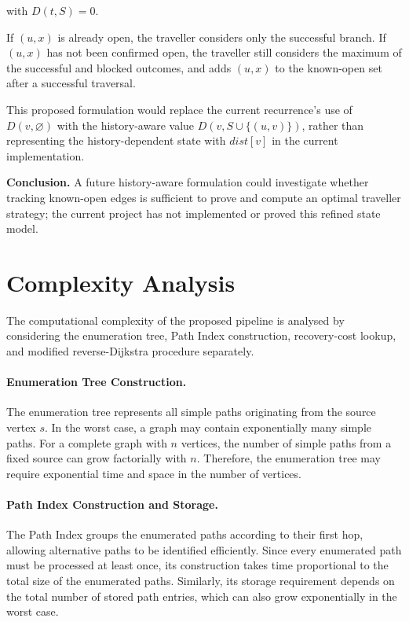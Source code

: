 \documentclass{article}
\begin{document}
with $D(t,S)=0$.

If $(u,x)$ is already open, the traveller considers only the successful branch. If $(u,x)$ has not been confirmed open, the traveller still considers the maximum of the successful and blocked outcomes, and adds $(u,x)$ to the known-open set after a successful traversal.

This proposed formulation would replace the current recurrence's use of $D(v,\varnothing)$ with the history-aware value $D(v,S\cup\{(u,v)\})$, rather than representing the history-dependent state with $dist[v]$ in the current implementation.

\noindent\textbf{Conclusion.} A future history-aware formulation could investigate whether tracking known-open edges is sufficient to prove and compute an optimal traveller strategy; the current project has not implemented or proved this refined state model.

\section{Complexity Analysis}

The computational complexity of the proposed pipeline is analysed by considering the enumeration tree, Path Index construction, recovery-cost lookup, and modified reverse-Dijkstra procedure separately.

\paragraph{Enumeration Tree Construction.}

The enumeration tree represents all simple paths originating from the source vertex $s$. In the worst case, a graph may contain exponentially many simple paths. For a complete graph with $n$ vertices, the number of simple paths from a fixed source can grow factorially with $n$. Therefore, the enumeration tree may require exponential time and space in the number of vertices.

\paragraph{Path Index Construction and Storage.}

The Path Index groups the enumerated paths according to their first hop, allowing alternative paths to be identified efficiently. Since every enumerated path must be processed at least once, its construction takes time proportional to the total size of the enumerated paths. Similarly, its storage requirement depends on the total number of stored path entries, which can also grow exponentially in the worst case.
\end{document}

